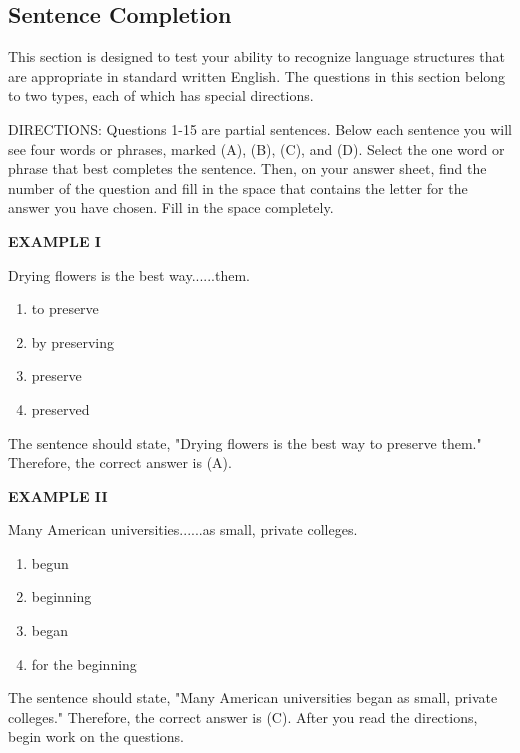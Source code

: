 \documentclass[12pt]{article}
\begin{document}
\subsection*{Sentence Completion}
This section is designed to test your ability to recognize language structures that are appropriate in standard written English. The questions in this section belong to two types, each of which has special directions.\par
DIRECTIONS: Questions 1-15 are partial sentences. Below each sentence you will see four words or phrases, marked (A), (B), (C), and (D). Select the one word or phrase that best completes the sentence. Then, on your answer sheet, find the number of the question and fill in the space that contains the letter for the answer you have chosen. Fill in the space completely.\par
\begin{exampleblock}
\textbf{EXAMPLE I}\par
\noindent Drying flowers is the best way......them.
\begin{enumerate}[label=(\Alph*),leftmargin=*,itemsep=0.2em]
\item to preserve
\item by preserving
\item preserve
\item preserved
\end{enumerate}
\vspace{0.25\baselineskip}
The sentence should state, "Drying flowers is the best way to preserve them." Therefore, the correct answer is (A).\par
\end{exampleblock}
\begin{exampleblock}
\textbf{EXAMPLE II}\par
\noindent Many American universities......as small, private colleges.
\begin{enumerate}[label=(\Alph*),leftmargin=*,itemsep=0.2em]
\item begun
\item beginning
\item began
\item for the beginning
\end{enumerate}
\vspace{0.25\baselineskip}
The sentence should state, "Many American universities began as small, private colleges." Therefore, the correct answer is (C). After you read the directions, begin work on the questions.\par
\end{exampleblock}
\end{document}
